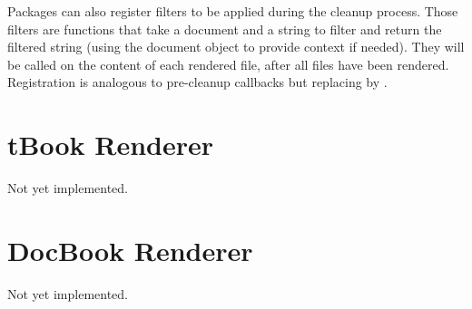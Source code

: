 Packages can also register filters to be applied during the cleanup
process. Those filters are functions that take a document and a string
to filter and return the filtered string (using the document object to
provide context if needed). They will be called on the content of each
rendered file, after all files have been rendered.  Registration is
analogous to pre-cleanup callbacks but replacing
 by .


\section{tBook Renderer}

Not yet implemented.

\section{DocBook Renderer}

Not yet implemented.
